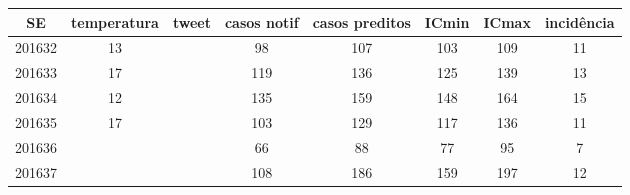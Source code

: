 \begin{tabular}{c|ccccccc}
  \hline
SE & temperatura & tweet & casos notif & casos preditos & ICmin & ICmax & incidência \\ 
  \hline
201632 & 13 &  & 98 & 107 & 103 & 109 & 11 \\ 
  201633 & 17 &  & 119 & 136 & 125 & 139 & 13 \\ 
  201634 & 12 &  & 135 & 159 & 148 & 164 & 15 \\ 
  201635 & 17 &  & 103 & 129 & 117 & 136 & 11 \\ 
  201636 &  &  & 66 & 88 & 77 & 95 & 7 \\ 
  201637 &  &  & 108 & 186 & 159 & 197 & 12 \\ 
   \hline
\end{tabular}
